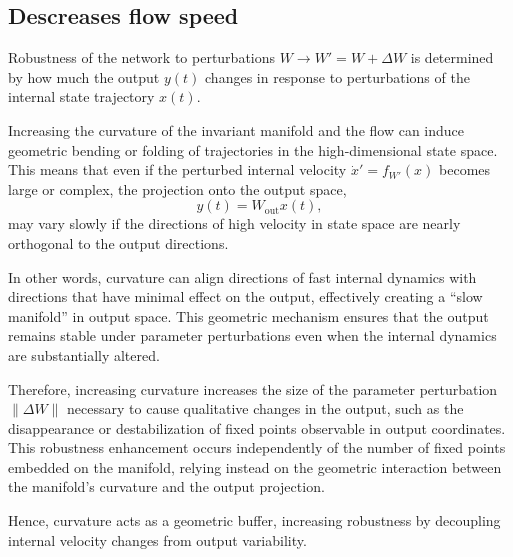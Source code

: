 \documentclass{article}
\begin{document}
\subsection{Descreases flow speed}
Robustness of the network to perturbations \(W \to W' = W + \Delta W\) is determined by how much the output \(y(t)\) changes in response to perturbations of the internal state trajectory \(x(t)\).

Increasing the curvature of the invariant manifold and the flow can induce geometric bending or folding of trajectories in the high-dimensional state space. This means that even if the perturbed internal velocity \(\dot{x}' = f_{W'}(x)\) becomes large or complex, the projection onto the output space,
\[
y(t) = W_{\mathrm{out}} x(t),
\]
may vary slowly if the directions of high velocity in state space are nearly orthogonal to the output directions.

In other words, curvature can align directions of fast internal dynamics with directions that have minimal effect on the output, effectively creating a “slow manifold” in output space. This geometric mechanism ensures that the output remains stable under parameter perturbations even when the internal dynamics are substantially altered.

Therefore, increasing curvature increases the size of the parameter perturbation \(\|\Delta W\|\) necessary to cause qualitative changes in the output, such as the disappearance or destabilization of fixed points observable in output coordinates. This robustness enhancement occurs independently of the number of fixed points embedded on the manifold, relying instead on the geometric interaction between the manifold’s curvature and the output projection.

Hence, curvature acts as a geometric buffer, increasing robustness by decoupling internal velocity changes from output variability.
\end{document}
